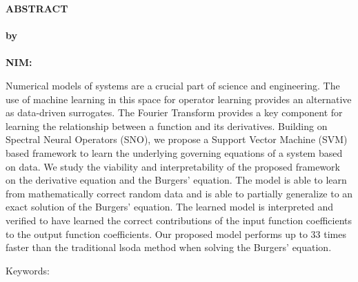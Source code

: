 \clearpage
{}
\begin{center}
\textbf{\large  ABSTRACT}\\[0.5cm]
\textbf{\large \judulcapitalized}\\[0.5cm]
\textbf{by}\\
\textbf{\penulis}\\
\textbf{NIM:\@\nim}\\[2em]
\end{center}

\noindent Numerical models of systems are a crucial part of science and engineering. The use of machine learning in this space for operator learning provides an alternative as data-driven surrogates. The Fourier Transform provides a key component for learning the relationship between a function and its derivatives. Building on Spectral Neural Operators (SNO), we propose a Support Vector Machine (SVM) based framework to learn the underlying governing equations of a system based on data. We study the viability and interpretability of the proposed framework on the derivative equation and the Burgers' equation. The model is able to learn from mathematically correct random data and is able to partially generalize to an exact solution of the Burgers' equation. The learned model is interpreted and verified to have learned the correct contributions of the input function coefficients to the output function coefficients. Our proposed model performs up to 33 times faster than the traditional lsoda method when solving the Burgers' equation.

\noindent Keywords: \keywords{}